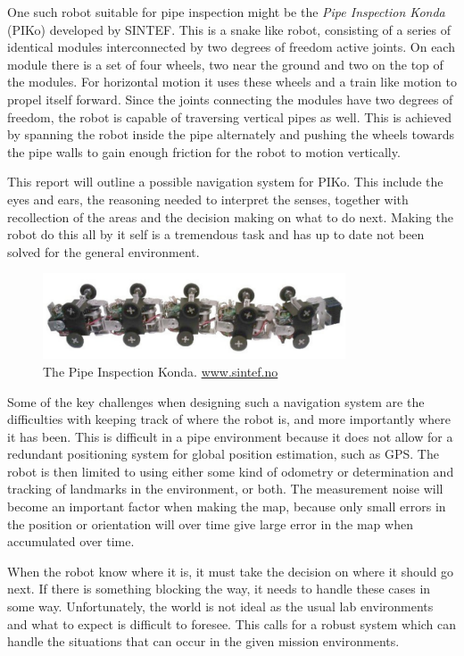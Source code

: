One such robot suitable for pipe inspection might be the \emph{Pipe Inspection Konda}
(PIKo) developed by SINTEF. This is a snake like robot, consisting of a series of identical
modules interconnected by two degrees of freedom active joints. On each module there is a
set of four wheels, two near the ground and two on the top of the modules. For
horizontal motion it uses these wheels and a train like motion to propel itself forward. Since the joints 
connecting the modules have two degrees of freedom, the robot is capable of traversing vertical pipes
as well. This is achieved by spanning the robot inside the pipe alternately and pushing the wheels towards
the pipe walls to gain enough friction for the robot to motion vertically. \cite{piko}

This report will outline a possible navigation system for PIKo. This include the eyes and
ears, the reasoning needed to interpret the senses, together with recollection of the
areas and the decision making on what to do next. Making the robot do this all by it self
is a tremendous task and has up to date not been solved for the general environment.
\begin{figure}[htbp]
    \centering
    \includegraphics[width=0.8\textwidth]{pics/piko}
    \caption[The Pipe Inspection Konda]{The Pipe Inspection Konda. \url{www.sintef.no}}
    \label{chap1:fig-piko}
\end{figure}

Some of the key challenges when designing such a navigation system are the difficulties
with keeping track of where the robot is, and more importantly where it has been. This is
difficult in a pipe environment because it does not allow for a redundant positioning
system for global position estimation, such as GPS. The robot is then limited to using
either some kind of odometry or determination and tracking of landmarks in the environment, 
or both. The measurement noise will become an important factor when making the map,
because only small errors in the position or orientation will over time give large error
in the map when accumulated over time. \cite{thrun}

When the robot know where it is, it must take the decision on where it should go next. If
there is something blocking the way, it needs to handle these cases in some way.
Unfortunately, the world is not ideal as the usual lab environments and what to expect is
difficult to foresee. 
This calls for a robust system which can handle the situations that can
occur in the given mission environments. 

